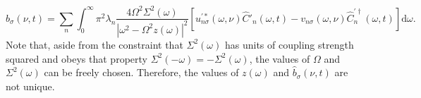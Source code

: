 \begin{equation}
\hat{b}_\sigma(\nu,t) = \sum_n\int_0^\infty\pi^2\lambda_n\frac{4\Omega^2\Sigma^2(\omega)}{|\omega^2 - \Omega^2z(\omega)|^2}\left[u^{\prime*}_{n\sigma}(\omega,\nu)\hat{C}'_n(\omega,t) - v_{n\sigma}(\omega,\nu)\hat{C}^{\prime\dagger}_n(\omega,t)\right]\mathrm{d}\omega.
\end{equation}
Note that, aside from the constraint that $\Sigma^2(\omega)$ has units of coupling strength squared and obeys that property $\Sigma^2(-\omega) = -\Sigma^2(\omega)$, the values of $\Omega$ and $\Sigma^2(\omega)$ can be freely chosen. Therefore, the values of $z(\omega)$ and $\hat{b}_\sigma(\nu,t)$ are not unique.









